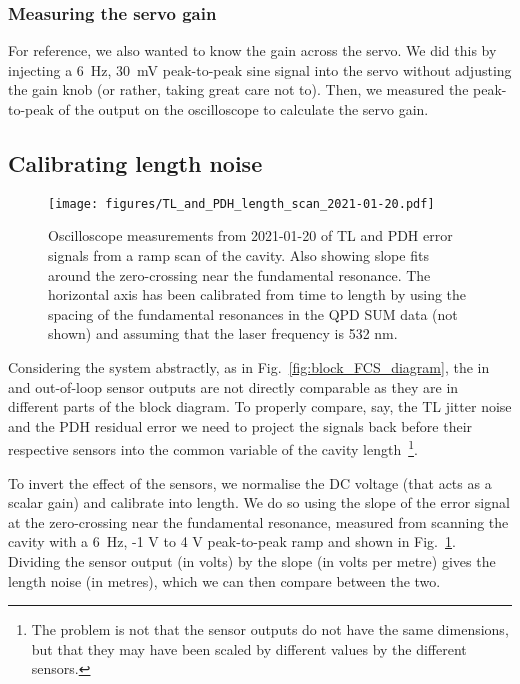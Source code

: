 \documentclass[aps,pra,superscriptaddress,reprint,nofootinbib]{revtex4-1}
\begin{document}
\subsubsection{Measuring the servo gain}

For reference, we also wanted to know the gain across the servo. We did this by injecting a 6~Hz, 30~mV peak-to-peak sine signal into the servo without adjusting the gain knob (or rather, taking great care not to). Then, we measured the peak-to-peak of the output on the oscilloscope to calculate the servo gain.

\subsection{Calibrating length noise}
\label{sec:length_noise}

\begin{figure}
	\texttt{[image: figures/TL\_and\_PDH\_length\_scan\_2021-01-20.pdf]}
	\caption{Oscilloscope measurements from 2021-01-20 of TL and PDH error signals from a ramp scan of the cavity. Also showing slope fits around the zero-crossing near the fundamental resonance. The horizontal axis has been calibrated from time to length by using the spacing of the fundamental resonances in the QPD SUM data (not shown) and assuming that the laser frequency is 532 nm.}
	\label{fig:TL_and_PDH_length_scan_2021-01-20}
\end{figure}

Considering the system abstractly, as in Fig.~\ref{fig:block_FCS_diagram}, the in and out-of-loop sensor outputs are not directly comparable as they are in different parts of the block diagram. To properly compare, say, the TL jitter noise and the PDH residual error we need to project the signals back before their respective sensors into the common variable of the cavity length~\footnote{The problem is not that the sensor outputs do not have the same dimensions, but that they may have been scaled by different values by the different sensors.}.

To invert the effect of the sensors, we normalise the DC voltage (that acts as a scalar gain) and calibrate into length. We do so using the slope of the error signal at the zero-crossing near the fundamental resonance, measured from scanning the cavity with a 6~Hz, -1 V to 4 V peak-to-peak ramp and shown in Fig.~\ref{fig:TL_and_PDH_length_scan_2021-01-20}. Dividing the sensor output (in volts) by the slope (in volts per metre) gives the length noise (in metres), which we can then compare between the two.
\end{document}
